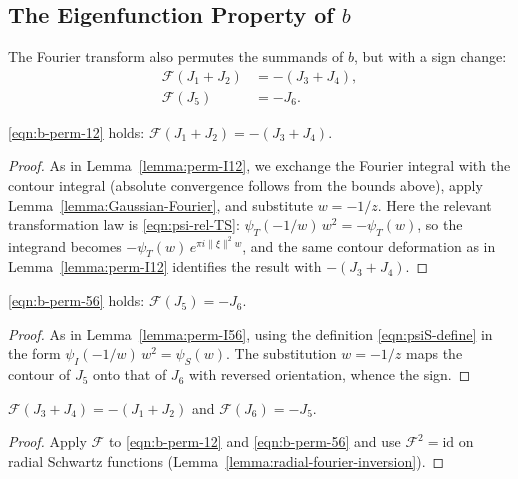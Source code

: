 \subsection{The Eigenfunction Property of $b$}

The Fourier transform also permutes the summands of $b$, but with a sign change:
\begin{align}
    \mathcal{F}(J_1 + J_2) &= -(J_3 + J_4), \label{eqn:b-perm-12}\\
    \mathcal{F}(J_5) &= -J_6. \label{eqn:b-perm-56}
\end{align}

\begin{lemma}\label{lemma:perm-J12}\leanok
\eqref{eqn:b-perm-12} holds: $\mathcal{F}(J_1 + J_2) = -(J_3 + J_4)$.
\end{lemma}
\begin{proof}
As in Lemma~\ref{lemma:perm-I12}, we exchange the Fourier integral with the contour integral (absolute convergence follows from the bounds above), apply Lemma~\ref{lemma:Gaussian-Fourier}, and substitute $w = -1/z$. Here the relevant transformation law is \eqref{eqn:psi-rel-TS}: $\psi_T(-1/w)\, w^2 = -\psi_T(w)$, so the integrand becomes $-\psi_T(w)\, e^{\pi i \|\xi\|^2 w}$, and the same contour deformation as in Lemma~\ref{lemma:perm-I12} identifies the result with $-(J_3 + J_4)$.
\end{proof}

\begin{lemma}\label{lemma:perm-J56}\leanok
\eqref{eqn:b-perm-56} holds: $\mathcal{F}(J_5) = -J_6$.
\end{lemma}
\begin{proof}
As in Lemma~\ref{lemma:perm-I56}, using the definition \eqref{eqn:psiS-define} in the form $\psi_I(-1/w)\, w^2 = \psi_S(w)$. The substitution $w = -1/z$ maps the contour of $J_5$ onto that of $J_6$ with reversed orientation, whence the sign.
\end{proof}

\begin{lemma}\label{lemma:perm-J-reverse}\leanok
$\mathcal{F}(J_3 + J_4) = -(J_1 + J_2)$ and $\mathcal{F}(J_6) = -J_5$.
\end{lemma}
\begin{proof}\leanok
Apply $\mathcal{F}$ to \eqref{eqn:b-perm-12} and \eqref{eqn:b-perm-56} and use $\mathcal{F}^2 = \mathrm{id}$ on radial Schwartz functions (Lemma~\ref{lemma:radial-fourier-inversion}).
\end{proof}

